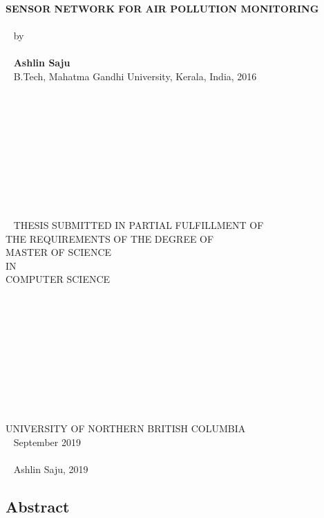 \documentclass[a4paper,12pt,titlepage,oneside]{report}
\begin{document}
\begin{center}
	\textbf{{\textsf{\\ SENSOR NETWORK FOR AIR POLLUTION MONITORING}}}
	\\~
	\\~
	\textsf{by}
	\\~
	\\~
	\textbf{\textsf{Ashlin Saju}}
	\\~
	\textsf{B.Tech, Mahatma Gandhi University, Kerala, India, 2016}
	\\~
	\\~
	\\~
	\\~
	\\~
	\\~
	\\~
	\\~
	\\~
	\\~
	\\~
	\textsf{THESIS SUBMITTED IN PARTIAL FULFILLMENT OF}\\
	\textsf{THE REQUIREMENTS OF THE DEGREE OF}\\
	\textsf{MASTER OF SCIENCE}\\
	\textsf{IN}\\
	\textsf{COMPUTER SCIENCE}
	\\~
	\\~
	\\~
	\\~
	\\~
	\\~
	\\~
	\\~
	\\~
	\\~
	\\
	\textsf{UNIVERSITY OF NORTHERN BRITISH COLUMBIA}
	\\~
	\textsf{September 2019}
	\\~
	\\~
	\textcopyright \textsf{ Ashlin Saju, 2019}

\end{center}


\doublespacing
\normalsize

\newpage
{}

\subsection*{Abstract}
\end{document}
